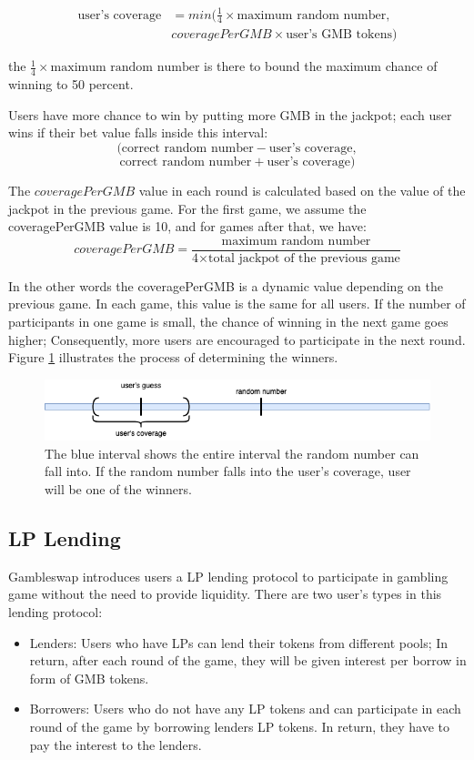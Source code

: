 \documentclass{article}
\begin{document}
\begin{align*}
    \text{user's coverage} &= min( \frac{1}{4} \times \text{maximum random number}, \\
    &coveragePerGMB \times \text{user's GMB tokens})
\end{align*}

the $\frac{1}{4} \times \text{maximum random number}$ is there to bound the maximum chance of winning to 50 percent.

Users have more chance to win by putting more GMB in the jackpot; each user wins if their bet value falls inside this interval:
$$
(\text{correct random number} - \text{user's coverage},$$
$$
\text{correct random number} + \text{user's coverage})
$$

The $coveragePerGMB$ value in each round is calculated based on the value of the jackpot in the previous game. For the first game, we assume the coveragePerGMB value is 10, and for games after that, we have:
$$
coveragePerGMB = \frac{\text{maximum random number}}{\text{4}
\times \text{total jackpot of the previous game}}
$$


In the other words the coveragePerGMB is a dynamic value depending on the previous game. In each game, this value is the same for all users. 
If the number of participants in one game is small, the chance of winning in the next game goes higher; Consequently, more users are encouraged to participate in the next round. Figure \ref{fig:coverage} illustrates the process of determining the winners.


\begin{figure}
    \centering
    \includegraphics[width=\textwidth]{coverage.png}
    \caption{The blue interval shows the entire interval the random number can fall into. If the random number falls into the user's coverage, user will be one of the winners.}
    \label{fig:coverage}
\end{figure}

\subsection{LP Lending}
Gambleswap introduces users a LP lending protocol to participate in gambling game without the need to provide liquidity. There are two user's types in this lending protocol:
\begin{itemize}
    \item Lenders: Users who have LPs can lend their tokens from different pools; In return, after each round of the game, they will be given interest per borrow in form of GMB tokens.
    \item Borrowers: Users who do not have any LP tokens and can participate in each round of the game by borrowing lenders LP tokens. In return, they have to pay the interest to the lenders.
\end{itemize}
\end{document}
